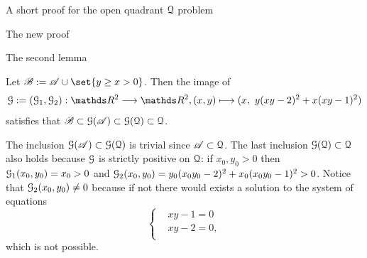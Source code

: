 \documentclass[11pt, a4paper, english, twoside, notitlepage, openright]{report}
\begin{document}
\begin{chapter}{A short proof for the open quadrant $\mathcal{Q}$ problem}
\begin{section}{The new proof}
\begin{subsection}{The second lemma}
\begin{lemma}\label{lemma2}
Let $\mathscr{B} :=  \mathscr{A} \cup \set{y \ge x > 0}$. Then the image of 
$$
\GG := (\GG_1, \GG_2): \R^2 \longrightarrow \R^2, (x, y) \longmapsto (x,\ y(xy - 2)^2 + x (xy - 1)^2)
$$
satisfies that $\mathscr{B} \subset \mathcal{G}(\mathscr{A}) \subset \mathcal{G}(\mathcal{Q}) \subset \mathcal{Q}$.
\begin{Proof}
The inclusion $\mathcal{G}(\mathscr{A}) \subset \mathcal{G}(\mathcal{Q})$ is trivial since $\mathscr{A} \subset \mathcal{Q}$. The last inclusion $\mathcal{G}(\mathcal{Q}) \subset \mathcal{Q}$ also holds because $\mathcal{G}$ is strictly positive on $\mathcal{Q}$: if $x_0, y_0 > 0$ then $\mathcal{G}_1(x_0, y_0) = x_0 > 0$ and $\mathcal{G}_2(x_0, y_0) = y_0(x_0y_0 - 2)^2 + x_0 (x_0y_0 - 1)^2 > 0$. Notice that $\mathcal{G}_2(x_0, y_0) \ne 0$ because if not there would exists a solution to the system of equations
\begin{equation*}
\left\{
\begin{aligned}
&xy - 1 = 0\\
&xy - 2 = 0,\\
\end{aligned}
\right.
\end{equation*}
which is not possible.


\end{Proof}
\end{lemma}
\end{subsection}
\end{section}
\end{chapter}
\end{document}
